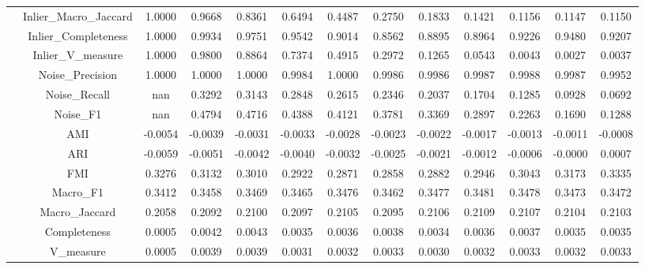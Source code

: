\begin{table}[ht!]
\begin{tabular*}{\linewidth}{@{} lc c c c c c c c c c c c @{}}
 & Inlier_Macro_Jaccard  & 1.0000 & 0.9668 & 0.8361 & 0.6494 & 0.4487 & 0.2750 & 0.1833 & 0.1421 & 0.1156 & 0.1147 & 0.1150 \\

 & Inlier_Completeness  & 1.0000 & 0.9934 & 0.9751 & 0.9542 & 0.9014 & 0.8562 & 0.8895 & 0.8964 & 0.9226 & 0.9480 & 0.9207 \\

 & Inlier_V_measure  & 1.0000 & 0.9800 & 0.8864 & 0.7374 & 0.4915 & 0.2972 & 0.1265 & 0.0543 & 0.0043 & 0.0027 & 0.0037 \\

 & Noise_Precision  & 1.0000 & 1.0000 & 1.0000 & 0.9984 & 1.0000 & 0.9986 & 0.9986 & 0.9987 & 0.9988 & 0.9987 & 0.9952 \\

 & Noise_Recall  & nan & 0.3292 & 0.3143 & 0.2848 & 0.2615 & 0.2346 & 0.2037 & 0.1704 & 0.1285 & 0.0928 & 0.0692 \\

 & Noise_F1  & nan & 0.4794 & 0.4716 & 0.4388 & 0.4121 & 0.3781 & 0.3369 & 0.2897 & 0.2263 & 0.1690 & 0.1288 \\
\addlinespace
\multirow{17}{*}{K-means++}
 & AMI  & -0.0054 & -0.0039 & -0.0031 & -0.0033 & -0.0028 & -0.0023 & -0.0022 & -0.0017 & -0.0013 & -0.0011 & -0.0008 \\

 & ARI  & -0.0059 & -0.0051 & -0.0042 & -0.0040 & -0.0032 & -0.0025 & -0.0021 & -0.0012 & -0.0006 & -0.0000 & 0.0007 \\

 & FMI  & 0.3276 & 0.3132 & 0.3010 & 0.2922 & 0.2871 & 0.2858 & 0.2882 & 0.2946 & 0.3043 & 0.3173 & 0.3335 \\

 & Macro_F1  & 0.3412 & 0.3458 & 0.3469 & 0.3465 & 0.3476 & 0.3462 & 0.3477 & 0.3481 & 0.3478 & 0.3473 & 0.3472 \\

 & Macro_Jaccard  & 0.2058 & 0.2092 & 0.2100 & 0.2097 & 0.2105 & 0.2095 & 0.2106 & 0.2109 & 0.2107 & 0.2104 & 0.2103 \\

 & Completeness  & 0.0005 & 0.0042 & 0.0043 & 0.0035 & 0.0036 & 0.0038 & 0.0034 & 0.0036 & 0.0037 & 0.0035 & 0.0035 \\

 & V_measure  & 0.0005 & 0.0039 & 0.0039 & 0.0031 & 0.0032 & 0.0033 & 0.0030 & 0.0032 & 0.0033 & 0.0032 & 0.0033 \\


\end{tabular*}
\end{table}
